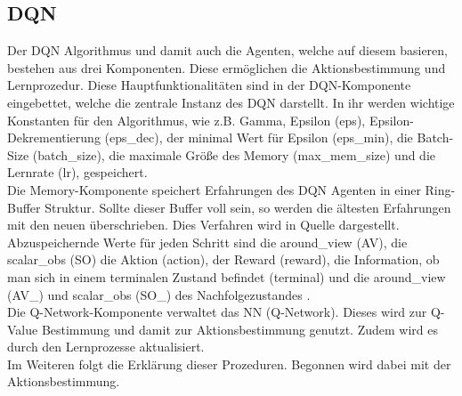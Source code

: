 \subsection{DQN} \label{subsec:Konzept_DQN}
Der DQN Algorithmus und damit auch die Agenten, welche auf diesem basieren, bestehen aus drei Komponenten. Diese ermöglichen die Aktionsbestimmung und Lernprozedur.
Diese Hauptfunktionalitäten sind in der DQN-Komponente eingebettet, welche die zentrale Instanz des DQN darstellt. In ihr werden wichtige Konstanten für den Algorithmus, wie z.B. Gamma, Epsilon (eps), Epsilon-Dekrementierung (eps\_dec), der minimal Wert für Epsilon (eps\_min), die Batch-Size (batch\_size), die maximale Größe des Memory (max\_mem\_size) und die Lernrate (lr), gespeichert.\\
Die Memory-Komponente speichert Erfahrungen des DQN Agenten in einer Ring-Buffer Struktur. Sollte dieser Buffer voll sein, so werden die ältesten Erfahrungen mit den neuen überschrieben. Dies Verfahren wird in Quelle \cite[S. 5]{DBLP:journals/corr/MnihKSGAWR13} dargestellt.
Abzuspeichernde Werte für jeden Schritt sind die around\_view (AV), die scalar\_obs (SO) die Aktion (action), der Reward (reward), die Information, ob man sich in einem terminalen Zustand befindet (terminal) und die around\_view (AV\_) und scalar\_obs (SO\_) des Nachfolgezustandes .\\
Die Q-Network-Komponente verwaltet das NN (Q-Network). Dieses wird zur Q-Value Bestimmung und damit zur Aktionsbestimmung genutzt. Zudem wird es durch den Lernprozesse aktualisiert.\\
Im Weiteren folgt die Erklärung dieser Prozeduren. Begonnen wird dabei mit der Aktionsbestimmung.

